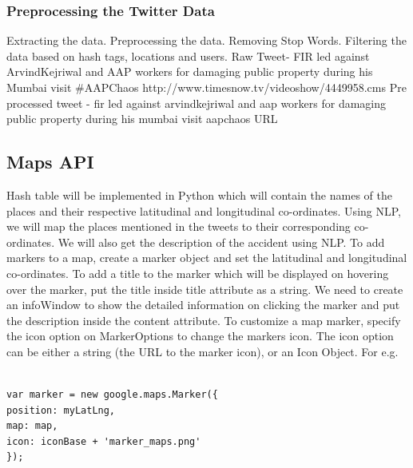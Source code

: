 \documentclass[journal]{IEEEtran}
\begin{document}
\subsubsection{Preprocessing the Twitter Data}
\noindent Extracting the data.
Preprocessing the data.
Removing Stop Words.
Filtering the data based on hash tags, locations and users.
Raw Tweet- FIR led against ArvindKejriwal and AAP workers for damaging public property during his Mumbai visit \#AAPChaos \newline http://www.timesnow.tv/videoshow/4449958.cms
Pre processed tweet - fir led against arvindkejriwal and aap workers for damaging public property during his mumbai visit aapchaos URL
\subsection{Maps API}
\noindent Hash table will be implemented in Python which will contain the names of the places and their respective latitudinal and longitudinal co-ordinates. Using NLP, we will map the places mentioned in the tweets to their corresponding co-ordinates. We will also get the description of the accident using NLP. To add markers to a map, create a marker object and set the latitudinal and longitudinal co-ordinates. 
To add a title to the marker which will be displayed on hovering over the marker, put the title inside title attribute as a string. We need to create an infoWindow to show the detailed information on clicking the marker and put the description inside the content attribute. 
To customize a map marker, specify the icon option on MarkerOptions to change the markers icon. The icon option can be either a string (the URL to the marker icon), or an Icon Object.
For e.g.
\begin{verbatim}

var marker = new google.maps.Marker({
position: myLatLng,
map: map,
icon: iconBase + 'marker_maps.png'
});
\end{verbatim}
\end{document}
